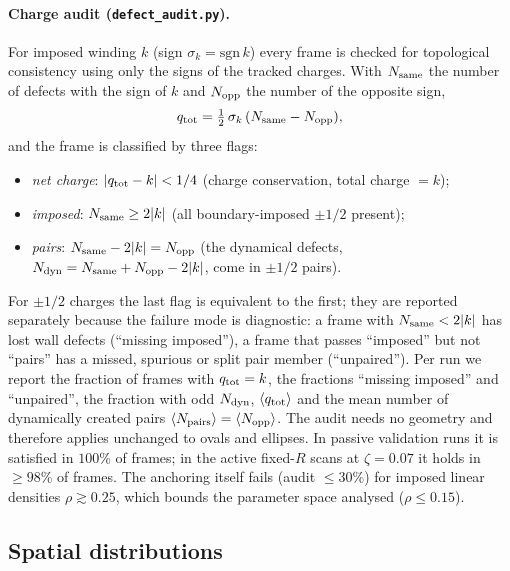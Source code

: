 \paragraph{Charge audit (\texttt{defect\_audit.py}).}
For imposed winding $k$ (sign $\sigma_k=\mathrm{sgn}\,k$) every frame is checked for
topological consistency using only the signs of the tracked charges. With
$N_{\rm same}$ the number of defects with the sign of $k$ and $N_{\rm opp}$ the number of the
opposite sign,
\begin{equation}
  q_{\rm tot} = \tfrac12\,\sigma_k\,(N_{\rm same}-N_{\rm opp}),
\end{equation}
and the frame is classified by three flags:
\begin{itemize}
  \item \emph{net charge}: $|q_{\rm tot}-k|<1/4$ (charge conservation, total charge $=k$);
  \item \emph{imposed}: $N_{\rm same}\ge 2|k|$ (all boundary-imposed $\pm1/2$ present);
  \item \emph{pairs}: $N_{\rm same}-2|k| = N_{\rm opp}$ (the dynamical defects,
        $N_{\rm dyn}=N_{\rm same}+N_{\rm opp}-2|k|$, come in $\pm1/2$ pairs).
\end{itemize}
For $\pm1/2$ charges the last flag is equivalent to the first; they are reported
separately because the failure mode is diagnostic: a frame with $N_{\rm same}<2|k|$
has lost wall defects (``missing imposed''), a frame that passes ``imposed'' but not
``pairs'' has a missed, spurious or split pair member (``unpaired''). Per run we report
the fraction of frames with $q_{\rm tot}=k$, the fractions ``missing imposed'' and
``unpaired'', the fraction with odd $N_{\rm dyn}$, $\langle q_{\rm tot}\rangle$ and the mean
number of dynamically created pairs $\langle N_{\rm pairs}\rangle=\langle N_{\rm opp}\rangle$.
The audit needs no geometry and therefore applies unchanged to ovals and ellipses.
In passive validation runs it is satisfied in $100\%$ of frames; in the active fixed-$R$ scans
at $\zeta=0.07$ it holds in $\ge98\%$ of frames. The anchoring itself fails (audit
$\le 30\%$) for imposed linear densities $\rho\gtrsim0.25$, which bounds the parameter
space analysed ($\rho\le 0.15$).

\subsection{Spatial distributions}
\label{sec:methods-spatial}

